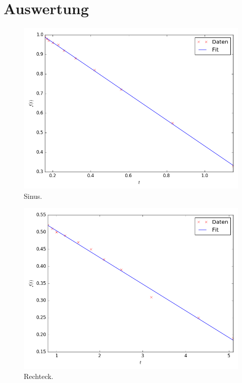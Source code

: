 \section{Auswertung}
\label{sec:Auswertung}

\begin{figure}
  \centering
  \includegraphics{Sinus.png}
  \caption{Sinus.}
  \label{fig:Sinus}
\end{figure}


\begin{figure}
	\centering
	\includegraphics{Rechteck.png}
	\caption{Rechteck.}
	\label{fig:Rechteck}
\end{figure}


